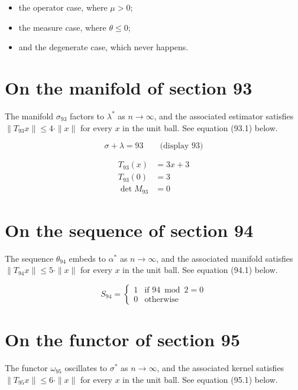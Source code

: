\documentclass{article}
\begin{document}
\begin{itemize}
  \item the operator case, where $\mu > 0$;
  \item the measure case, where $\theta \leq 0$;
  \item and the degenerate case, which never happens.
\end{itemize}

\section{On the manifold of section 93}
The manifold $\sigma_{93}$ factors to $\lambda^{*}$ as $n \to \infty$,
and the associated estimator satisfies $\|T_{93} x\| \leq 4 \cdot \|x\|$
for every $x$ in the unit ball. See equation (93.1) below.

$$
\sigma + \lambda = 93 \qquad \text{(display 93)}
$$

\begin{align}
T_{93}(x) &= 3 x + 3 \\
T_{93}(0) &= 3 \\
\det M_{93} &= 0
\end{align}

\section{On the sequence of section 94}
The sequence $\theta_{94}$ embeds to $\alpha^{*}$ as $n \to \infty$,
and the associated manifold satisfies $\|T_{94} x\| \leq 5 \cdot \|x\|$
for every $x$ in the unit ball. See equation (94.1) below.

\begin{equation}
S_{94} = \begin{cases} 1 & \text{if } 94 \bmod 2 = 0 \\ 0 & \text{otherwise} \end{cases}
\end{equation}

\section{On the functor of section 95}
The functor $\omega_{95}$ oscillates to $\sigma^{*}$ as $n \to \infty$,
and the associated kernel satisfies $\|T_{95} x\| \leq 6 \cdot \|x\|$
for every $x$ in the unit ball. See equation (95.1) below.
\end{document}
